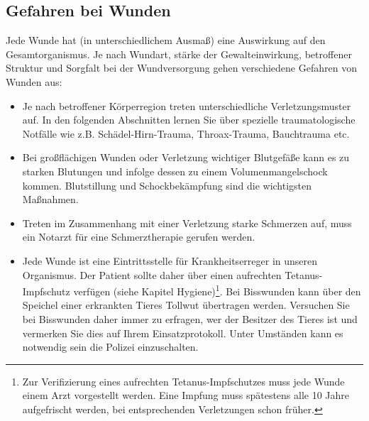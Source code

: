 \subsection{Gefahren bei Wunden}
Jede Wunde hat (in unterschiedlichem Ausmaß) eine Auswirkung auf den Gesamtorganismus. Je nach Wundart, stärke der Gewalteinwirkung, betroffener Struktur und Sorgfalt bei der Wundversorgung gehen verschiedene Gefahren von Wunden aus:
\begin{itemize}
    \item {} Je nach betroffener Körperregion treten unterschiedliche Verletzungsmuster auf. In den folgenden Abschnitten lernen Sie über spezielle traumatologische Notfälle wie z.B. Schädel-Hirn-Trauma, Throax-Trauma, Bauchtrauma etc.
    \item {} Bei großflächigen Wunden oder Verletzung wichtiger Blutgefäße kann es zu starken Blutungen und infolge dessen zu einem Volumenmangelschock kommen. Blutstillung und Schockbekämpfung sind die wichtigsten Maßnahmen.
    \item {} Treten im Zusammenhang mit einer Verletzung starke Schmerzen auf, muss ein Notarzt für eine Schmerztherapie gerufen werden.
    \item {} Jede Wunde ist eine
    Eintrittsstelle für Krankheitserreger in unseren Organismus. Der Patient sollte daher über einen aufrechten Tetanus-Impfschutz verfügen (siehe Kapitel Hygiene)\footnote{Zur Verifizierung eines aufrechten Tetanus-Impfschutzes muss jede Wunde einem Arzt vorgestellt werden. Eine Impfung muss spätestens alle 10 Jahre aufgefrischt werden, bei entsprechenden Verletzungen schon früher.\cite{BoehmerTaschRett6}}. Bei Bisswunden kann über den Speichel einer erkrankten Tieres Tollwut übertragen werden. Versuchen Sie bei Bisswunden daher immer zu erfragen, wer der Besitzer des Tieres ist und vermerken Sie dies auf Ihrem Einsatzprotokoll. Unter Umständen kann es notwendig sein die Polizei einzuschalten.
\end{itemize}







